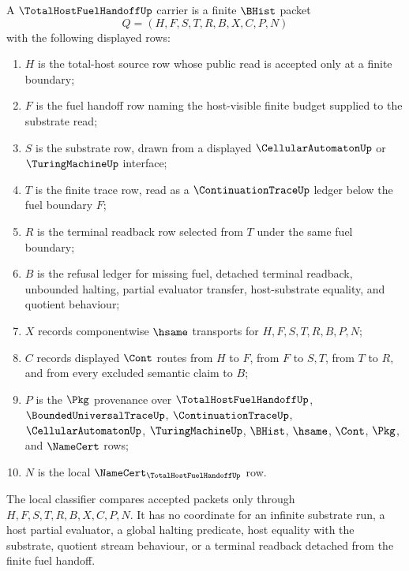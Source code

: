 \begin{definition}
\label{def:total-host-fuel-handoff-carrier}
A $\TotalHostFuelHandoffUp$ carrier is a finite $\BHist$ packet
$$
Q=(H,F,S,T,R,B,X,C,P,N)
$$
with the following displayed rows:
\begin{enumerate}
\item $H$ is the total-host source row whose public read is accepted only at a finite boundary;
\item $F$ is the fuel handoff row naming the host-visible finite budget supplied to the substrate read;
\item $S$ is the substrate row, drawn from a displayed $\CellularAutomatonUp$ or $\TuringMachineUp$ interface;
\item $T$ is the finite trace row, read as a $\ContinuationTraceUp$ ledger below the fuel boundary $F$;
\item $R$ is the terminal readback row selected from $T$ under the same fuel boundary;
\item $B$ is the refusal ledger for missing fuel, detached terminal readback, unbounded halting, partial evaluator transfer, host-substrate equality, and quotient behaviour;
\item $X$ records componentwise $\hsame$ transports for $H,F,S,T,R,B,P,N$;
\item $C$ records displayed $\Cont$ routes from $H$ to $F$, from $F$ to $S,T$, from $T$ to $R$, and from every excluded semantic claim to $B$;
\item $P$ is the $\Pkg$ provenance over $\TotalHostFuelHandoffUp$, $\BoundedUniversalTraceUp$, $\ContinuationTraceUp$, $\CellularAutomatonUp$, $\TuringMachineUp$, $\BHist$, $\hsame$, $\Cont$, $\Pkg$, and $\NameCert$ rows;
\item $N$ is the local $\NameCert_{\TotalHostFuelHandoffUp}$ row.
\end{enumerate}
The local classifier compares accepted packets only through $H,F,S,T,R,B,X,C,P,N$. It has no coordinate for an infinite substrate run, a host partial evaluator, a global halting predicate, host equality with the substrate, quotient stream behaviour, or a terminal readback detached from the finite fuel handoff.
\end{definition}

